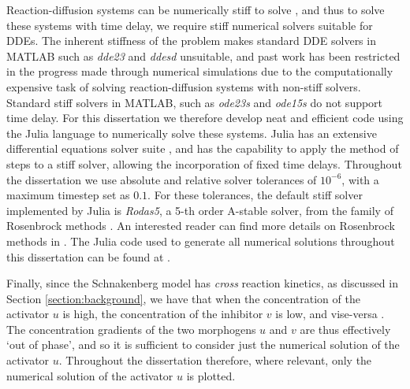 Reaction-diffusion systems can be numerically stiff to solve \cite{stiff1, william}, and thus to solve these systems with time delay, we require stiff numerical solvers suitable for DDEs. The inherent stiffness of the problem makes standard DDE solvers in MATLAB such as \emph{dde23} and \emph{ddesd} unsuitable, and past work has been restricted in the progress made through numerical simulations \cite{william} due to the computationally expensive task of solving reaction-diffusion systems with non-stiff solvers. Standard stiff solvers in MATLAB, such as \emph{ode23s} and \emph{ode15s} do not support time delay. For this dissertation we therefore develop neat and efficient code using the Julia language to numerically solve these systems. Julia has an extensive differential equations solver suite \cite{rodas}, and has the capability to apply the method of steps \cite{methsteps} to a stiff solver, allowing the incorporation of fixed time delays. Throughout the dissertation we use absolute and relative solver tolerances of $10^{-6}$, with a maximum timestep set as $0.1$. For these tolerances, the default stiff solver implemented by Julia is \emph{Rodas5}, a 5-th order A-stable solver, from the family of Rosenbrock methods \cite{rodas}. An interested reader can find more details on Rosenbrock methods in \cite{rosenbrock}. The Julia code used to generate all numerical solutions throughout this dissertation can be found at \cite{git}.

Finally, since the Schnakenberg model has \textit{cross} reaction kinetics, as discussed in Section \ref{section:background}, we have that when the concentration of the activator $u$ is high, the concentration of the inhibitor $v$ is low, and vise-versa \cite{murray}. The concentration gradients of the two morphogens $u$ and $v$ are thus effectively `out of phase', and so it is sufficient to consider just the numerical solution of the activator $u$. Throughout the dissertation therefore, where relevant, only the numerical solution of the activator $u$ is plotted.
